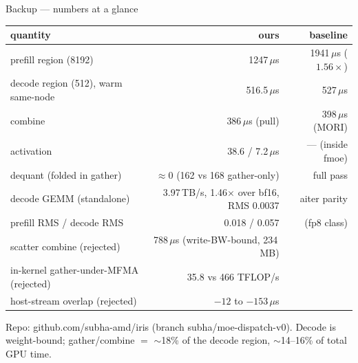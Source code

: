 \documentclass[pdf,aspectratio=169]{beamer}
\newcommand{\mc}[1]{{\ttfamily\small #1}}
\begin{document}
\begin{frame}{Backup --- numbers at a glance}
\scriptsize
\begin{tabular}{lrr}
\toprule
quantity & ours & baseline \\
\midrule
prefill region (8192) & 1247\,$\mu$s & 1941\,$\mu$s \;($1.56\times$) \\
decode region (512), warm same-node & 516.5\,$\mu$s & 527\,$\mu$s \\
combine & 386\,$\mu$s (pull) & 398\,$\mu$s (MORI) \\
activation & 38.6 / 7.2\,$\mu$s & --- (inside fmoe) \\
dequant (folded in gather) & $\approx$0 (162 vs 168 gather-only) & full pass \\
decode GEMM (standalone) & 3.97\,TB/s, 1.46$\times$ over bf16, RMS 0.0037 & aiter parity \\
prefill RMS / decode RMS & 0.018 / 0.057 & (fp8 class) \\
\midrule
scatter combine (rejected) & 788\,$\mu$s (write-BW-bound, 234\,MB) & \\
in-kernel gather-under-MFMA (rejected) & 35.8 vs 466 TFLOP/s & \\
host-stream overlap (rejected) & $-12$ to $-153\,\mu$s & \\
\bottomrule
\end{tabular}
\vspace{1ex}

\scriptsize Repo: \mc{github.com/subha-amd/iris} (branch \mc{subha/moe-dispatch-v0}). Decode is weight-bound; gather/combine $=$ $\sim$18\% of the decode region, $\sim$14--16\% of total GPU time.
\end{frame}
\end{document}
